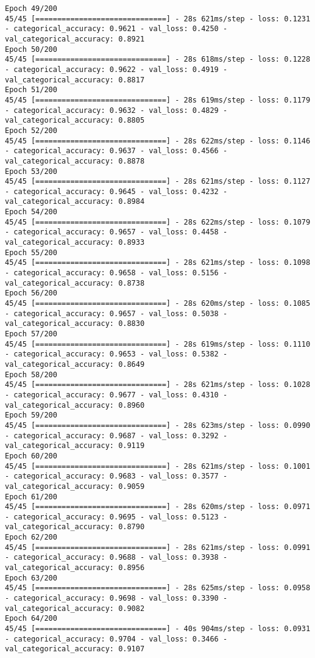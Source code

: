 \begin{lstlisting}
Epoch 49/200
45/45 [==============================] - 28s 621ms/step - loss: 0.1231 - categorical_accuracy: 0.9621 - val_loss: 0.4250 - val_categorical_accuracy: 0.8921
Epoch 50/200
45/45 [==============================] - 28s 618ms/step - loss: 0.1228 - categorical_accuracy: 0.9622 - val_loss: 0.4919 - val_categorical_accuracy: 0.8817
Epoch 51/200
45/45 [==============================] - 28s 619ms/step - loss: 0.1179 - categorical_accuracy: 0.9632 - val_loss: 0.4829 - val_categorical_accuracy: 0.8805
Epoch 52/200
45/45 [==============================] - 28s 622ms/step - loss: 0.1146 - categorical_accuracy: 0.9637 - val_loss: 0.4566 - val_categorical_accuracy: 0.8878
Epoch 53/200
45/45 [==============================] - 28s 621ms/step - loss: 0.1127 - categorical_accuracy: 0.9645 - val_loss: 0.4232 - val_categorical_accuracy: 0.8984
Epoch 54/200
45/45 [==============================] - 28s 622ms/step - loss: 0.1079 - categorical_accuracy: 0.9657 - val_loss: 0.4458 - val_categorical_accuracy: 0.8933
Epoch 55/200
45/45 [==============================] - 28s 621ms/step - loss: 0.1098 - categorical_accuracy: 0.9658 - val_loss: 0.5156 - val_categorical_accuracy: 0.8738
Epoch 56/200
45/45 [==============================] - 28s 620ms/step - loss: 0.1085 - categorical_accuracy: 0.9657 - val_loss: 0.5038 - val_categorical_accuracy: 0.8830
Epoch 57/200
45/45 [==============================] - 28s 619ms/step - loss: 0.1110 - categorical_accuracy: 0.9653 - val_loss: 0.5382 - val_categorical_accuracy: 0.8649
Epoch 58/200
45/45 [==============================] - 28s 621ms/step - loss: 0.1028 - categorical_accuracy: 0.9677 - val_loss: 0.4310 - val_categorical_accuracy: 0.8960
Epoch 59/200
45/45 [==============================] - 28s 623ms/step - loss: 0.0990 - categorical_accuracy: 0.9687 - val_loss: 0.3292 - val_categorical_accuracy: 0.9119
Epoch 60/200
45/45 [==============================] - 28s 621ms/step - loss: 0.1001 - categorical_accuracy: 0.9683 - val_loss: 0.3577 - val_categorical_accuracy: 0.9059
Epoch 61/200
45/45 [==============================] - 28s 620ms/step - loss: 0.0971 - categorical_accuracy: 0.9695 - val_loss: 0.5123 - val_categorical_accuracy: 0.8790
Epoch 62/200
45/45 [==============================] - 28s 621ms/step - loss: 0.0991 - categorical_accuracy: 0.9688 - val_loss: 0.3938 - val_categorical_accuracy: 0.8956
Epoch 63/200
45/45 [==============================] - 28s 625ms/step - loss: 0.0958 - categorical_accuracy: 0.9698 - val_loss: 0.3390 - val_categorical_accuracy: 0.9082
Epoch 64/200
45/45 [==============================] - 40s 904ms/step - loss: 0.0931 - categorical_accuracy: 0.9704 - val_loss: 0.3466 - val_categorical_accuracy: 0.9107

\end{lstlisting}
